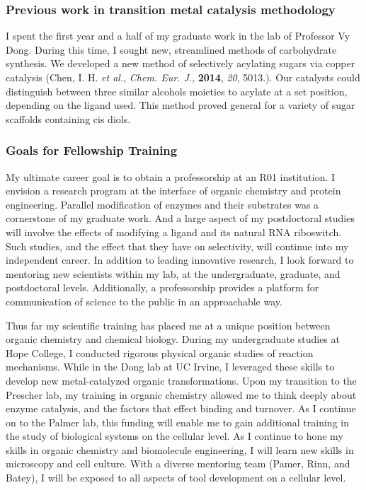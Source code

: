 \documentclass{F32}
\begin{document}
\subsubsection*{Previous work in transition metal catalysis methodology}
I spent the first year and a half of my graduate work in the lab of Professor Vy Dong. During this time, I sought new, streamlined methods of carbohydrate synthesis. We developed a new method of selectively acylating sugars via copper catalysis (Chen, I. H. \textit{et al.}, \textit{Chem. Eur. J.}, \textbf{2014}, \textit{20}, 5013.). Our catalysts could distinguish between three similar alcohols moieties to acylate at a set position, depending on the ligand used. This method proved general for a variety of sugar scaffolds containing cis diols.

\subsubsection*{Goals for Fellowship Training}
My ultimate career goal is to obtain a professorship at an R01 institution. I envision a research program at the interface of organic chemistry and protein engineering. Parallel modification of enzymes and their substrates was a cornerstone of my graduate work. And a large aspect of my postdoctoral studies will involve the effects of modifying a ligand and its natural RNA riboswitch. Such studies, and the effect that they have on selectivity, will continue into my independent career. In addition to leading innovative research, I look forward to mentoring new scientists within my lab, at the undergraduate, graduate, and postdoctoral levels. Additionally, a professorship provides a platform for communication of science to the public in an approachable way.

Thus far my scientific training has placed me at a unique position between organic chemistry and chemical biology. During my undergraduate studies at Hope College, I conducted rigorous physical organic studies of reaction mechanisms. While in the Dong lab at UC Irvine, I leveraged these skills to develop new metal-catalyzed organic transformations. Upon my transition to the Prescher lab, my training in organic chemistry allowed me to think deeply about enzyme catalysis, and the factors that effect binding and turnover. As I continue on to the Palmer lab, this funding will enable me to gain additional training in the study of biological systems on the cellular level. As I continue to hone my skills in organic chemistry and biomolecule engineering, I will learn new skills in microscopy and cell culture. With a diverse mentoring team (Pamer, Rinn, and Batey), I will be exposed to all aspects of tool development on a cellular level.
\end{document}
